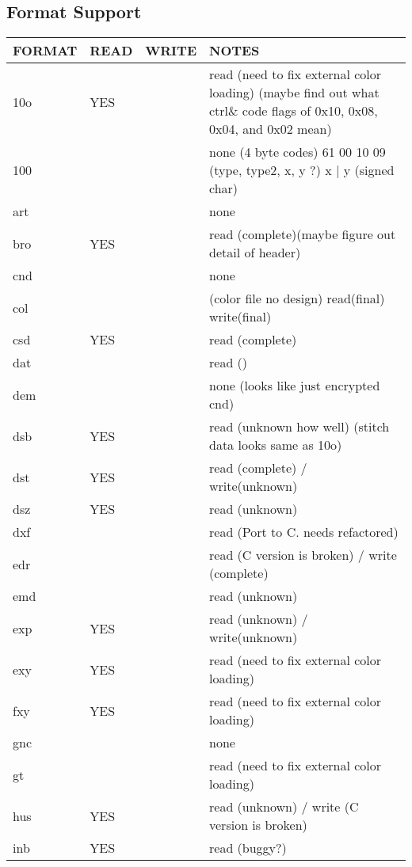 
\subsection{Format Support}

\begin{longtable}{l l l p{8cm}}
FORMAT & READ & WRITE & NOTES \\
\hline
10o    & YES   &       & read (need to fix external color loading) (maybe find out what ctrl\& code flags of 0x10, 0x08, 0x04, and 0x02 mean) \\
100    &       &       & none (4 byte codes) 61 00 10 09 (type, type2, x, y ?) x | y (signed char) \\
art    &       &       & none \\
bro    & YES   &       & read (complete)(maybe figure out detail of header) \\
cnd    &       &       & none \\
col    &       &       & (color file no design) read(final) write(final) \\
csd    & YES   &       & read (complete) \\
dat    &       &       & read () \\
dem    &       &       & none (looks like just encrypted cnd) \\
dsb    & YES   &       & read (unknown how well) (stitch data looks same as 10o) \\
dst    & YES   &       & read (complete) / write(unknown) \\
dsz    & YES   &       & read (unknown) \\
dxf    &       &       & read (Port to C. needs refactored) \\
edr    &       &       & read (C version is broken) / write (complete) \\
emd    &       &       & read (unknown) \\
exp    & YES   &       & read (unknown) / write(unknown) \\
exy    & YES   &       & read (need to fix external color loading) \\
fxy    & YES   &       & read (need to fix external color loading) \\
gnc    &       &       & none \\
gt     &       &       & read (need to fix external color loading) \\
hus    & YES   &       & read (unknown) / write (C version is broken) \\
inb    & YES   &       & read (buggy?) \\

\end{longtable}
